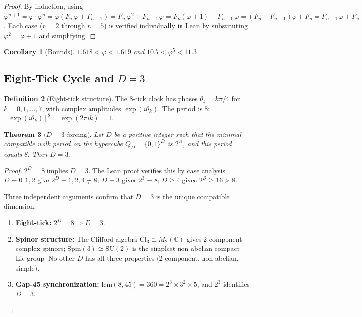 \documentclass[12pt]{article}
\newtheorem{theorem}{Theorem}[section]
\newtheorem{corollary}[theorem]{Corollary}
\theoremstyle{definition}
\newtheorem{definition}[theorem]{Definition}
\theoremstyle{remark}
\begin{document}
\begin{proof}
By induction, using $\varphi^{n+1} = \varphi \cdot \varphi^n =
\varphi(F_n\,\varphi + F_{n-1}) = F_n\,\varphi^2 + F_{n-1}\,\varphi
= F_n(\varphi + 1) + F_{n-1}\,\varphi = (F_n + F_{n-1})\varphi + F_n
= F_{n+1}\,\varphi + F_n$. Each case ($n = 2$ through $n = 5$) is
verified individually in Lean by substituting $\varphi^2 = \varphi + 1$
and simplifying.
\end{proof}

\begin{corollary}[Bounds]
$1.618 < \varphi < 1.619$ and $10.7 < \varphi^5 < 11.3$.
\end{corollary}

\subsection{Eight-Tick Cycle and $D = 3$}
\label{sec:eight-tick}

\begin{definition}[Eight-tick structure]
The 8-tick clock has phases $\theta_k = k\pi/4$ for $k = 0, 1,
\ldots, 7$, with complex amplitudes $\exp(i\theta_k)$. The period is
8: $[\exp(i\theta_k)]^8 = \exp(2\pi i k) = 1$.
\end{definition}

\begin{theorem}[$D = 3$ forcing]
\label{thm:D3}
Let $D$ be a positive integer such that the minimal
compatible walk period on the hypercube $Q_D = \{0,1\}^D$ is
$2^D$, and this period equals 8. Then $D = 3$.
\end{theorem}

\begin{proof}
$2^D = 8$ implies $D = 3$. The Lean proof verifies this by
case analysis: $D = 0, 1, 2$ give $2^D = 1, 2, 4 \neq 8$; $D = 3$
gives $2^3 = 8$; $D \geq 4$ gives $2^D \geq 16 > 8$.

Three independent arguments confirm that $D = 3$ is the unique
compatible dimension:
\begin{enumerate}
  \item \textbf{Eight-tick:} $2^D = 8 \Longrightarrow D = 3$.
  \item \textbf{Spinor structure:} The Clifford algebra
    $\mathrm{Cl}_3 \cong M_2(\mathbb{C})$ gives 2-component complex
    spinors; $\mathrm{Spin}(3) \cong \mathrm{SU}(2)$ is the simplest
    non-abelian compact Lie group. No other $D$ has all three
    properties (2-component, non-abelian, simple).
  \item \textbf{Gap-45 synchronization:}
    $\mathrm{lcm}(8, 45) = 360 = 2^3 \times 3^2 \times 5$, and
    $2^3$ identifies $D = 3$.
\end{enumerate}
\end{proof}
\end{document}
